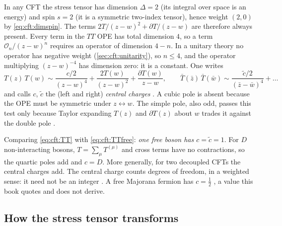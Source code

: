 In any CFT the stress tensor has dimension $\Delta=2$ (its integral over space is an energy) and
spin $s=2$ (it is a symmetric two-index tensor), hence weight $(2,0)$ by
\eqref{eq:cft:dimspin}. The terms $2T/(z-w)^2+\partial T/(z-w)$ are therefore always present.
Every term in the $TT$ OPE has total dimension $4$, so a term $\mathcal O_n/(z-w)^n$ requires an
operator of dimension $4-n$. In a unitary theory no operator has negative weight
(\cref{sec:cft:unitarity}), so $n\le4$, and the operator multiplying $(z-w)^{-4}$ has dimension
zero: it is a constant. One writes
\begin{equation}\label{eq:cft:TT}
  T(z)\,T(w)\sim\frac{c/2}{(z-w)^4}+\frac{2T(w)}{(z-w)^2}+\frac{\partial T(w)}{z-w},
  \qquad
  \bar T(\bar z)\,\bar T(\bar w)\sim\frac{\tilde c/2}{(\bar z-\bar w)^4}+\dots
\end{equation}
and calls $c$, $\tilde c$ the (left and right) \emph{central charges}
. A cubic pole is absent because the OPE must be symmetric
under $z\leftrightarrow w$. The simple pole, also odd, passes this test only because Taylor
expanding $T(z)$ and $\partial T(z)$ about $w$ trades it against the double pole
.

Comparing \eqref{eq:cft:TT} with \eqref{eq:cft:TTfree}: \emph{one free boson has
$c=\tilde c=1$}. For $D$ non-interacting bosons, $T=\sum_\mu T^{(\mu)}$ and cross terms have no
contractions, so the quartic poles add and $c=D$. More generally, for two decoupled CFTs the
central charges add. The central charge counts degrees of freedom, in a weighted sense: it need
not be an integer . A free Majorana fermion has $c=\tfrac12$
, a value this book quotes and does not derive.

\subsection{How the stress tensor transforms}

